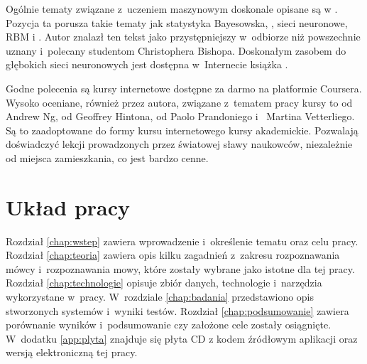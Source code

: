 Ogólnie tematy związane z~uczeniem maszynowym doskonale opisane są w
\cite{patternClassification}. Pozycja ta porusza takie tematy jak statystyka Bayesowska,
, sieci neuronowe, RBM
i . Autor znalazł ten tekst jako przystępniejszy w~odbiorze niż powszechnie
uznany i~polecany studentom  Christophera Bishopa.
Doskonałym zasobem do głębokich sieci neuronowych jest dostępna w~Internecie książka
\cite{deeplearningbook}.

Godne polecenia są kursy internetowe dostępne za darmo na platformie Coursera.
Wysoko oceniane, również przez autora, związane z~tematem pracy kursy to
 od Andrew Ng,
 od Geoffrey Hintona,
 od Paolo Prandoniego i~ Martina Vetterliego.
Są to zaadoptowane do formy kursu internetowego kursy akademickie. Pozwalają
doświadczyć lekcji prowadzonych przez światowej sławy naukowców, niezależnie
od miejsca zamieszkania, co jest bardzo cenne.

\section{Układ pracy}\label{sec:uklad_pracy}

Rozdział \ref{chap:wstep} zawiera wprowadzenie i~określenie tematu oraz celu
pracy. Rozdział \ref{chap:teoria} zawiera opis kilku zagadnień z~zakresu
rozpoznawania mówcy i~rozpoznawania mowy, które zostały wybrane jako
istotne dla tej pracy. Rozdział \ref{chap:technologie}
opisuje zbiór danych, technologie i~narzędzia wykorzystane w~pracy. W~rozdziale
\ref{chap:badania} przedstawiono opis stworzonych systemów i~wyniki testów. Rozdział
\ref{chap:podsumowanie} zawiera porównanie wyników i~podsumowanie czy założone
cele zostały osiągnięte. W~dodatku \ref{app:plyta} znajduje się płyta CD z
kodem źródłowym aplikacji oraz wersją elektroniczną tej pracy.

